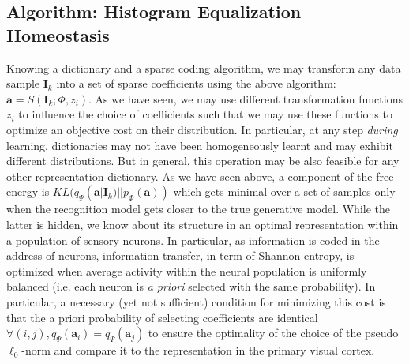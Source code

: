 \documentclass[a4paper, 11pt, draft]{article} %
\newcommand{\coef}{\mathbf{a}} %
\newcommand{\image}{\mathbf{I}} %
\newcommand{\dico}{\Phi} %
\begin{document}
\subsection{Algorithm: Histogram Equalization Homeostasis}\label{HEH}
Knowing a dictionary and a sparse coding algorithm, we may transform any data sample $\image_k$ into a set of sparse coefficients using the above algorithm: $\coef = S(\image_k; \dico, z_i)$. As we have seen, we may use different transformation functions $z_i$ to influence the choice of coefficients such that we may use these functions to optimize an objective cost on their distribution.
In particular, at any step \emph{during} learning, dictionaries may not have been homogeneously learnt and may exhibit different distributions. But in general, this operation may be also feasible for any other representation dictionary.
As we have seen above, a component of the free-energy is $KL( q_\Psi(\coef | \image_k) || p_\dico(\coef) )$ which gets minimal over a set of samples only when the recognition model gets closer to the true generative model. While the latter is hidden, we know about its structure in an optimal representation within a population of sensory neurons. In particular, as information is coded in the address of neurons, information transfer, in term of Shannon entropy, is optimized when average activity within the neural population is uniformly balanced (i.e. each neuron is \emph{a priori} selected with the same probability).
In particular, a necessary (yet not sufficient) condition for minimizing this cost is that the a priori probability of selecting coefficients are identical $\forall (i,j), q_\Psi(\coef_i)=q_\Psi(\coef_j)$ to ensure the optimality of the choice of the pseudo $\ell_0$-norm and compare it to the representation in the primary visual cortex.
\end{document}
